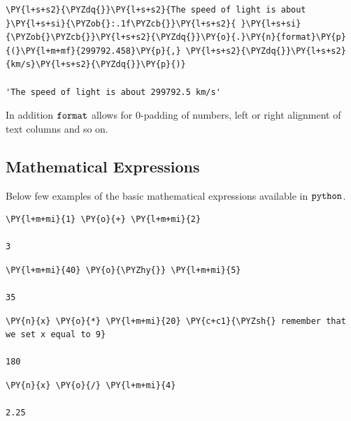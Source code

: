 \begin{codebox}            
\begin{Verbatim}[commandchars=\\\{\}]
\PY{l+s+s2}{\PYZdq{}}\PY{l+s+s2}{The speed of light is about }\PY{l+s+si}{\PYZob{}:.1f\PYZcb{}}\PY{l+s+s2}{ }\PY{l+s+si}{\PYZob{}\PYZcb{}}\PY{l+s+s2}{\PYZdq{}}\PY{o}{.}\PY{n}{format}\PY{p}{(}\PY{l+m+mf}{299792.458}\PY{p}{,} \PY{l+s+s2}{\PYZdq{}}\PY{l+s+s2}{km/s}\PY{l+s+s2}{\PYZdq{}}\PY{p}{)}

'The speed of light is about 299792.5 km/s'
\end{Verbatim}
\end{codebox}

In addition $\tt{format}$ allows for 0-padding of numbers, left or right alignment of text columns and so on.

\subsection{Mathematical Expressions}\label{mathematical-expressions}

Below few examples of the basic mathematical expressions available in $\tt{python}$.

\begin{codebox}            
\begin{Verbatim}[commandchars=\\\{\}]
\PY{l+m+mi}{1} \PY{o}{+} \PY{l+m+mi}{2}

3
\end{Verbatim}
\end{codebox}

\begin{codebox}            
\begin{Verbatim}[commandchars=\\\{\}]
\PY{l+m+mi}{40} \PY{o}{\PYZhy{}} \PY{l+m+mi}{5}

35
\end{Verbatim}
\end{codebox}

\begin{codebox}            
\begin{Verbatim}[commandchars=\\\{\}]
\PY{n}{x} \PY{o}{*} \PY{l+m+mi}{20} \PY{c+c1}{\PYZsh{} remember that we set x equal to 9}

180
\end{Verbatim}
\end{codebox}

\begin{codebox}            
\begin{Verbatim}[commandchars=\\\{\}]
\PY{n}{x} \PY{o}{/} \PY{l+m+mi}{4}

2.25
\end{Verbatim}
\end{codebox}

